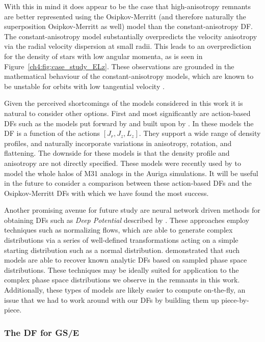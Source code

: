 With this in mind it does appear to be the case that high-anisotropy remnants are better represented using the Osipkov-Merritt (and therefore naturally the superposition Osipkov-Merritt as well) model than the constant-anisotropy DF. The constant-anisotropy model substantially overpredicts the velocity anisotropy via the radial velocity dispersion at small radii. This leads to an overprediction for the density of stars with low angular momenta, as is seen in Figure~\ref{ch4:fig:case_study_ELz}. These observations are grounded in the mathematical behaviour of the constant-anisotropy models, which are known to be unstable for orbits with low tangential velocity \parencite{binney14d}.

Given the perceived shortcomings of the models considered in this work it is natural to consider other options. First and most significantly are action-based DFs such as the models put forward by \textcite{binney14d} and built upon by \textcite{posti15}. In these models the DF is a function of the actions $[J_{r},J_{z},L_{z}]$. They support a wide range of density profiles, and naturally incorporate variations in anisotropy, rotation, and flattening. The downside for these models is that the density profile and anisotropy are not directly specified. These models were recently used by \textcite{gherghinescu23} to model the whole halos of M31 analogs in the Auriga simulations. It will be useful in the future to consider a comparison between these action-based DFs and the Osipkov-Merritt DFs with which we have found the most success.

Another promising avenue for future study are neural network driven methods for obtaining DFs such as \textit{Deep Potential} described by \textcite{green23}. These approaches employ techniques such as normalizing flows, which are able to generate complex distributions via a series of well-defined transformations acting on a simple starting distribution such as a normal distribution. \textcite{green23} demonstrated that such models are able to recover known analytic DFs based on sampled phase space distributions. These techniques may be ideally suited for application to the complex phase space distributions we observe in the remnants in this work. Additionally, these types of models are likely easier to compute on-the-fly, an issue that we had to work around with our DFs by building them up piece-by-piece.

\subsubsection{The DF for GS/E}


